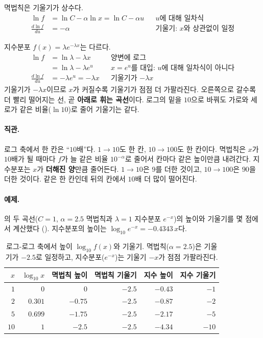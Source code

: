 \documentclass[11pt]{article}
\newcommand{\term}[1]{\textbf{#1}}
\begin{document}
멱법칙은 기울기가 상수다.
\begin{align*}
  \ln f &= \ln C - \alpha \ln x = \ln C - \alpha u
    && \text{$u$에 대해 일차식}\\
  \frac{d \ln f}{d u} &= -\alpha
    && \text{기울기: $x$와 상관없이 일정}
\end{align*}

지수분포 $f(x) = \lambda e^{-\lambda x}$는 다르다.
\begin{align*}
  \ln f &= \ln\lambda - \lambda x
    && \text{양변에 로그}\\
        &= \ln\lambda - \lambda e^{u}
    && \text{$x = e^u$를 대입: $u$에 대해 일차식이 아니다}\\
  \frac{d \ln f}{d u} &= -\lambda e^{u} = -\lambda x
    && \text{기울기가 $-\lambda x$}
\end{align*}
기울기가 $-\lambda x$이므로 $x$가 커질수록 기울기가 점점 더 가팔라진다.
오른쪽으로 갈수록 더 빨리 떨어지는 선, 곧 \term{아래로 휘는 곡선}이다.
로그의 밑을 $10$으로 바꿔도 가로와 세로가 같은 비율($\ln 10$)로 줄어 기울기는 같다.

\paragraph{직관.} 로그 축에서 한 칸은 ``$10$배''다. $1 \to 10$도 한 칸,
$10 \to 100$도 한 칸이다. 멱법칙은 $x$가 $10$배가 될 때마다 $f$가 늘 같은 비율
$10^{-\alpha}$로 줄어서 칸마다 같은 높이만큼 내려간다. 지수분포는 $x$가 \term{더해진 양}만큼
줄어든다. $1 \to 10$은 $9$를 더한 것이고, $10 \to 100$은 $90$을 더한 것이다. 같은 한 칸인데
뒤의 칸에서 $10$배 더 많이 떨어진다.

\paragraph{예제.} 의 두 곡선($C = 1$, $\alpha = 2.5$ 멱법칙과
$\lambda = 1$ 지수분포 $e^{-x}$)의 높이와 기울기를 몇 점에서 계산했다
(). 지수분포의 높이는 $\log_{10} e^{-x} = -0.4343\,x$다.

\begin{table}[H]
  \centering
  \caption{로그-로그 축에서 높이 $\log_{10} f(x)$와 기울기. 멱법칙($\alpha = 2.5$)은
    기울기가 $-2.5$로 일정하고, 지수분포($e^{-x}$)는 기울기 $-x$가 점점 가팔라진다.}
  \label{tab:loglog-slope}
  \begin{tabular}{rrrrrr}
    \toprule
    $x$ & $\log_{10} x$ & 멱법칙 높이 & 멱법칙 기울기 & 지수 높이 & 지수 기울기 \\
    \midrule
    $1$  & $0$     & $0$     & $-2.5$ & $-0.43$ & $-1$ \\
    \midrule
    $2$  & $0.301$ & $-0.75$ & $-2.5$ & $-0.87$ & $-2$ \\
    \midrule
    $5$  & $0.699$ & $-1.75$ & $-2.5$ & $-2.17$ & $-5$ \\
    \midrule
    $10$ & $1$     & $-2.5$  & $-2.5$ & $-4.34$ & $-10$ \\
    \bottomrule
  \end{tabular}
\end{table}
\end{document}
